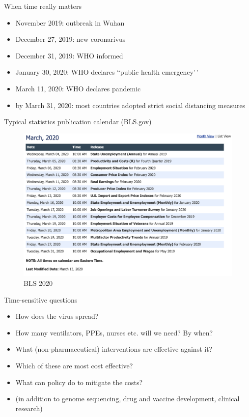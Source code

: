 \documentclass[
  ignorenonframetext,
  aspectratio=1610,
]{beamer}
\providecommand{\tightlist}{%
  \setlength{\itemsep}{0pt}\setlength{\parskip}{0pt}}
\begin{document}
\begin{frame}{When time really matters}
\protect\hypertarget{when-time-really-matters-1}{}
\begin{itemize}
\tightlist
\item
  November 2019: outbreak in Wuhan
\item
  December 27, 2019: new coronarivus
\item
  December 31, 2019: WHO informed
\item
  January 30, 2020: WHO declares ``public health emergency'\,'
\item
  March 11, 2020: WHO declares pandemic
\item
  by March 31, 2020: most countries adopted strict social distancing
  measures
\end{itemize}
\end{frame}

\begin{frame}{Typical statistics publication calendar (BLS.gov)}
\protect\hypertarget{typical-statistics-publication-calendar-bls.gov}{}
\begin{figure}
\centering
\includegraphics{exhibit/fig/bls-march-2020.png}
\caption{BLS 2020}
\end{figure}
\end{frame}

\begin{frame}{Time-sensitive questions}
\protect\hypertarget{time-sensitive-questions}{}
\begin{itemize}
\tightlist
\item
  How does the virus spread?
\item
  How many ventilators, PPEs, nurses etc. will we need? By when?
\item
  What (non-pharmaceutical) interventions are effective against it?
\item
  Which of these are most cost effective?
\item
  What can policy do to mitigate the costs?
\item
  (in addition to genome sequencing, drug and vaccine development,
  clinical research)
\end{itemize}
\end{frame}
\end{document}
